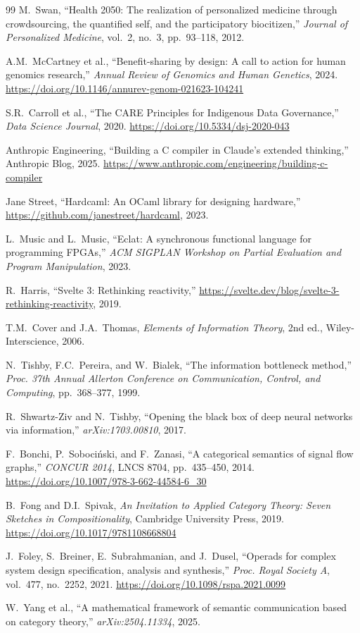\documentclass[11pt,letterpaper]{article}
\newcommand{\doi}[1]{\url{https://doi.org/#1}}
\begin{document}
\begin{thebibliography}{99}
M.~Swan,
``Health 2050: The realization of personalized medicine through crowdsourcing, the quantified self, and the participatory biocitizen,''
\textit{Journal of Personalized Medicine}, vol.~2, no.~3, pp.~93--118, 2012.

A.M.~McCartney et al.,
``Benefit-sharing by design: A call to action for human genomics research,''
\textit{Annual Review of Genomics and Human Genetics}, 2024.
\newblock \doi{10.1146/annurev-genom-021623-104241}

S.R.~Carroll et al.,
``The CARE Principles for Indigenous Data Governance,''
\textit{Data Science Journal}, 2020.
\newblock \doi{10.5334/dsj-2020-043}

Anthropic Engineering,
``Building a C compiler in Claude's extended thinking,''
Anthropic Blog, 2025.
\newblock \url{https://www.anthropic.com/engineering/building-c-compiler}

Jane Street,
``Hardcaml: An OCaml library for designing hardware,''
\url{https://github.com/janestreet/hardcaml}, 2023.

L.~Music and L.~Music,
``Eclat: A synchronous functional language for programming FPGAs,''
\textit{ACM SIGPLAN Workshop on Partial Evaluation and Program Manipulation}, 2023.

R.~Harris,
``Svelte 3: Rethinking reactivity,''
\url{https://svelte.dev/blog/svelte-3-rethinking-reactivity}, 2019.

T.M.~Cover and J.A.~Thomas,
\textit{Elements of Information Theory},
2nd ed., Wiley-Interscience, 2006.

N.~Tishby, F.C.~Pereira, and W.~Bialek,
``The information bottleneck method,''
\textit{Proc. 37th Annual Allerton Conference on Communication, Control, and Computing}, pp.~368--377, 1999.

R.~Shwartz-Ziv and N.~Tishby,
``Opening the black box of deep neural networks via information,''
\textit{arXiv:1703.00810}, 2017.

F.~Bonchi, P.~Soboci\'{n}ski, and F.~Zanasi,
``A categorical semantics of signal flow graphs,''
\textit{CONCUR 2014}, LNCS 8704, pp.~435--450, 2014.
\newblock \doi{10.1007/978-3-662-44584-6_30}

B.~Fong and D.I.~Spivak,
\textit{An Invitation to Applied Category Theory: Seven Sketches in Compositionality},
Cambridge University Press, 2019.
\newblock \doi{10.1017/9781108668804}

J.~Foley, S.~Breiner, E.~Subrahmanian, and J.~Dusel,
``Operads for complex system design specification, analysis and synthesis,''
\textit{Proc. Royal Society A}, vol.~477, no.~2252, 2021.
\newblock \doi{10.1098/rspa.2021.0099}

W.~Yang et al.,
``A mathematical framework of semantic communication based on category theory,''
\textit{arXiv:2504.11334}, 2025.

\end{thebibliography}
\end{document}
